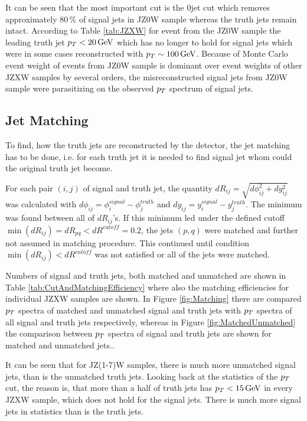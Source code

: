 It can be seen that the most important cut is the 0jet cut which removes
approximately $80\,\%$ of signal jets in JZ0W sample whereas the truth jets
remain intact. According to Table \ref{tab:JZXW} for event from the JZ0W sample
the leading truth jet $p_{T} < 20 \,\text{GeV}$ which has no longer to hold for signal
jets which were in some cases reconstructed with $p_{T} \sim 100 \,\text{GeV}$. Because of
Monte Carlo event weight of events from JZ0W sample is dominant over event
weights of other JZXW samples by several orders, the misreconstructed signal
jets from JZ0W sample were parasitizing on the observed $p_{T}$ spectrum of signal
jets.

\subsection{Jet Matching}

To find, how the truth jets are reconstructed by the detector, the jet matching
has to be done, i.e. for each truth jet it is needed to find signal jet whom
could the original truth jet become. 

For each pair $(i,j)$ of signal and truth jet, the quantity $dR_{ij} =
\sqrt{d\phi_{ij}^2 + dy_{ij}^2}$ was calculated with $d\phi_{ij} =
\phi_i^{signal} - \phi_j^{truth}$ and $dy_{ij} = y_i^{signal} - y_j^{truth}$.
The minimum was found between all of $dR_{ij}$'s. If this minimum led under the
defined cutoff $\min(dR_{ij}) = dR_{pq} < dR^{cutoff} = 0.2$, the jets $(p,q)$
were matched and further not assumed in matching procedure. This continued until
condition $\min(dR_{ij}) < dR^{cutoff}$ was not satisfied or all of the jets
were matched.

Numbers of signal and truth jets, both matched and unmatched are shown in Table
\ref{tab:CutAndMatchingEfficiency} where also the matching efficiencies for
individual JZXW samples are shown. In Figure \ref{fig:Matching} there are
compared $p_{T}$ spectra of matched and unmatched signal and truth jets with $p_{T}$
spectra of all signal and truth jets respectively, whereas in Figure
\ref{fig:MatchedUnmatched} the comparison between $p_{T}$ spectra of signal and
truth jets are shown for matched and unmatched jets..

It can be seen that for JZ(1-7)W samples, there is much more unmatched signal
jets, than is the unmatched truth jets. Looking back at the statistics of the
$p_{T}$ cut, the reason is, that more than a half of truth jets has $p_{T} < 15
\,\text{GeV}$ in every JZXW sample, which does not hold for the signal jets. There is
much more signal jets in statistics than is the truth jets. 

